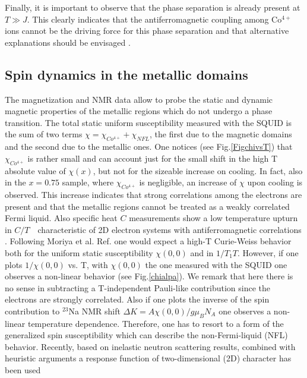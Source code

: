 \documentclass[prb,showpacs,preprintnumbers,amsmath,amssymb,floatfix]{revtex4}
\begin{document}
Finally, it is important to observe that the phase separation is
already present at $T\gg J$. This clearly indicates that the
antiferromagnetic coupling among Co$^{4+}$ ions cannot be the
driving force for this phase separation and that alternative
explanations should be envisaged \cite{Grilli}.



\subsection{Spin dynamics in the metallic domains}



The magnetization and NMR data allow to probe the static and
dynamic magnetic properties of the metallic regions which do not
undergo a phase transition. The total static uniform
susceptibility measured with the SQUID is the sum of two terms
$\chi= \chi_{Co^{4+}} + \chi_{NFL}$, the first due to the magnetic
domains and the second due to the metallic ones. One notices (see
Fig.\ref{FigchivsT}) that $\chi_{Co^{4+}}$ is rather small and can
account just for the small shift in the high T absolute value of
$\chi(x)$, but not for the sizeable increase on cooling. In fact,
also in the $x=0.75$ sample, where $\chi_{Co^{4+}}$ is negligible,
an increase of $\chi$ upon cooling is observed. This increase
indicates that strong correlations among the electrons are present
and that the metallic regions cannot be treated as a weakly
correlated Fermi liquid. Also specific heat $C$ measurements show
a low temperature upturn in $C/T$ \,\, \cite{Batlogg}
characteristic of 2D electron systems with antiferromagnetic
correlations \cite{vonL}. Following Moriya et al.
Ref. one would expect a high-T Curie-Weiss
behavior both for the uniform static susceptibility $\chi(0,0)$
and in $1/T_1T$. However, if one plots $1/\chi(0,0)$ vs. T, with
$\chi(0,0)$ the one measured with the SQUID one observes a
non-linear behavior (see Fig.\ref{chialpa}). We remark that here
there is no sense in subtracting a T-independent Pauli-like
contribution since the electrons are strongly correlated. Also if
one plots the inverse of the spin contribution to $^{23}$Na NMR
shift $\Delta K= A\chi(0,0)/g\mu_BN_A$ one observes a non-linear
temperature dependence. Therefore, one has to resort to a form of
the generalized spin susceptibility which can describe the
non-Fermi-liquid (NFL) behavior. Recently, based on inelastic
neutron scattering results, combined with heuristic arguments a
response function of two-dimensional (2D) character has been used
\end{document}
